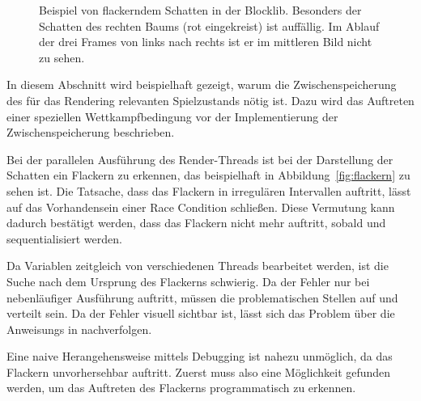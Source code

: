 \begin{figure}
	\hfill
	\hfill
	\caption[Beispiel von flackerndem Schatten in der Blocklib.]{Beispiel von flackerndem Schatten in der Blocklib. Besonders der Schatten des rechten Baums (rot eingekreist) ist auffällig. Im Ablauf der drei Frames von links nach rechts ist er im mittleren Bild nicht zu sehen.}\label{fig:flackern}
\end{figure}
In diesem Abschnitt wird beispielhaft gezeigt, warum die Zwischenspeicherung des für das Rendering relevanten Spielzustands nötig ist. Dazu wird das Auftreten einer speziellen Wettkampfbedingung vor der Implementierung der Zwischenspeicherung beschrieben. 

Bei der parallelen Ausführung des Render-Threads ist bei der Darstellung der Schatten ein Flackern zu erkennen, das beispielhaft in Abbildung~\vref{fig:flackern} zu sehen ist. Die Tatsache, dass das Flackern in irregulären Intervallen auftritt, lässt auf das Vorhandensein einer Race Condition schließen. Diese Vermutung kann dadurch bestätigt werden, dass das Flackern nicht mehr auftritt, sobald  und  sequentialisiert werden.

Da Variablen zeitgleich von verschiedenen Threads bearbeitet werden, ist die Suche nach dem Ursprung des Flackerns schwierig. Da der Fehler nur bei nebenläufiger Ausführung auftritt, müssen die problematischen Stellen auf  und  verteilt sein. Da der Fehler visuell sichtbar ist, lässt sich das Problem über die \glspl{Anweisung} in  nachverfolgen. 

Eine naive Herangehensweise mittels Debugging ist nahezu unmöglich, da das Flackern unvorhersehbar auftritt. Zuerst muss also eine Möglichkeit gefunden werden, um das Auftreten des Flackerns programmatisch zu erkennen.

